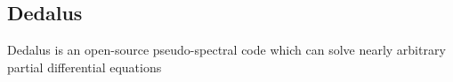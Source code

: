 {\color{purple}    
\subsection{Dedalus}}

Dedalus is an open-source pseudo-spectral code which can solve nearly arbitrary partial differential equations  
